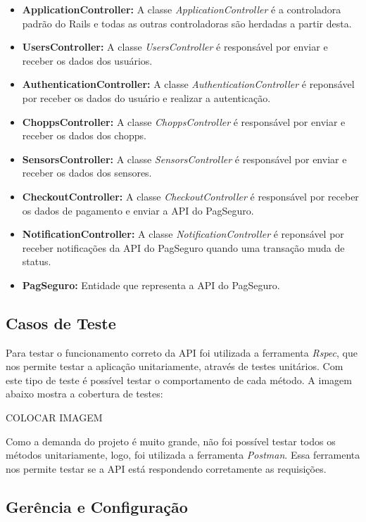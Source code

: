 \begin{itemize}
    \item \textbf{ApplicationController:} A classe \textit{ApplicationController} é a controladora padrão do Rails
    e todas as outras controladoras são herdadas a partir desta.
    \item \textbf{UsersController:} A classe \textit{UsersController} é responsável por enviar e receber os dados dos usuários.
    \item \textbf{AuthenticationController:} A classe \textit{AuthenticationController} é reponsável por receber os dados do usuário
    e realizar a autenticação.
    \item \textbf{ChoppsController:} A classe \textit{ChoppsController} é responsável por enviar e receber os dados dos chopps.
    \item \textbf{SensorsController:} A classe \textit{SensorsController} é responsável por enviar e receber os dados dos sensores.
    \item \textbf{CheckoutController:} A classe \textit{CheckoutController} é responsável por receber os dados de pagamento e enviar
    a API do PagSeguro.
    \item \textbf{NotificationController:} A classe \textit{NotificationController} é reponsável por receber notificações da API
    do PagSeguro quando uma transação muda de status.
    \item \textbf{PagSeguro:} Entidade que representa a API do PagSeguro.
\end{itemize}

\subsection{Casos de Teste}

Para testar o funcionamento correto da API foi utilizada a ferramenta \textit{Rspec}, que nos permite
testar a aplicação unitariamente, através de testes unitários. Com este tipo de teste é possível testar
o comportamento de cada método. A imagem abaixo mostra a cobertura de testes: 

COLOCAR IMAGEM

Como a demanda do projeto é muito grande, não foi possível testar todos os métodos unitariamente, logo,
foi utilizada a ferramenta \textit{Postman}. Essa ferramenta nos permite testar se a API está respondendo
corretamente as requisições.

\subsection{Gerência e Configuração}

